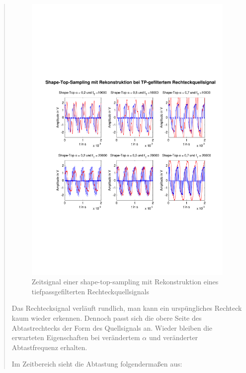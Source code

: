 \begin{quote}
    	\begin{figure}[H]
    \centering
        \includegraphics[scale=0.7, trim = 0cm 0cm 0cm 0cm,
        clip]{./Bilder/shape-top-tp-recht}
            \caption{Zeitsignal einer shape-top-sampling mit Rekonstruktion
            eines tiefpassgefilterten Rechteckquellsignals}
  	    \end{figure}
    	 
    	Das Rechtecksignal verläuft rundlich, man kann ein urspüngliches Rechteck
    	kaum wieder erkennen. Dennoch passt sich die obere Seite des
    	Abtastrechtecks der Form des Quellsignals an. Wieder bleiben die erwarteten
    	Eigenschaften bei verändertem $\alpha$ und veränderter Abtastfrequenz
    	erhalten.
    	
    	Im Zeitbereich sieht die Abtastung folgendermaßen aus:
    	

\end{quote}
